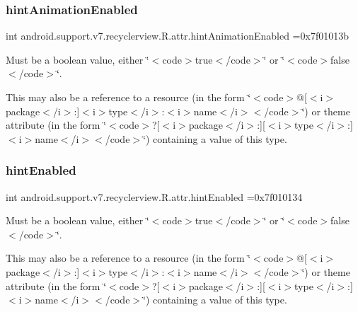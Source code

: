 \subsubsection{\texorpdfstring{hint\+Animation\+Enabled}{hintAnimationEnabled}}
{\footnotesize\ttfamily int android.\+support.\+v7.\+recyclerview.\+R.\+attr.\+hint\+Animation\+Enabled =0x7f01013b\hspace{0.3cm}{\ttfamily [static]}}

Must be a boolean value, either \char`\"{}$<$code$>$true$<$/code$>$\char`\"{} or \char`\"{}$<$code$>$false$<$/code$>$\char`\"{}. 

This may also be a reference to a resource (in the form \char`\"{}$<$code$>$@\mbox{[}$<$i$>$package$<$/i$>$\+:\mbox{]}$<$i$>$type$<$/i$>$\+:$<$i$>$name$<$/i$>$$<$/code$>$\char`\"{}) or theme attribute (in the form \char`\"{}$<$code$>$?\mbox{[}$<$i$>$package$<$/i$>$\+:\mbox{]}\mbox{[}$<$i$>$type$<$/i$>$\+:\mbox{]}$<$i$>$name$<$/i$>$$<$/code$>$\char`\"{}) containing a value of this type. \mbox{\label{classandroid_1_1support_1_1v7_1_1recyclerview_1_1R_1_1attr_ac7e41c578d73b8c44fd228ccec8542b4}} 
\subsubsection{\texorpdfstring{hint\+Enabled}{hintEnabled}}
{\footnotesize\ttfamily int android.\+support.\+v7.\+recyclerview.\+R.\+attr.\+hint\+Enabled =0x7f010134\hspace{0.3cm}{\ttfamily [static]}}

Must be a boolean value, either \char`\"{}$<$code$>$true$<$/code$>$\char`\"{} or \char`\"{}$<$code$>$false$<$/code$>$\char`\"{}. 

This may also be a reference to a resource (in the form \char`\"{}$<$code$>$@\mbox{[}$<$i$>$package$<$/i$>$\+:\mbox{]}$<$i$>$type$<$/i$>$\+:$<$i$>$name$<$/i$>$$<$/code$>$\char`\"{}) or theme attribute (in the form \char`\"{}$<$code$>$?\mbox{[}$<$i$>$package$<$/i$>$\+:\mbox{]}\mbox{[}$<$i$>$type$<$/i$>$\+:\mbox{]}$<$i$>$name$<$/i$>$$<$/code$>$\char`\"{}) containing a value of this type. \mbox{\label{classandroid_1_1support_1_1v7_1_1recyclerview_1_1R_1_1attr_a14e9beab1cfe4aff21170ec95e9176ee}} 
